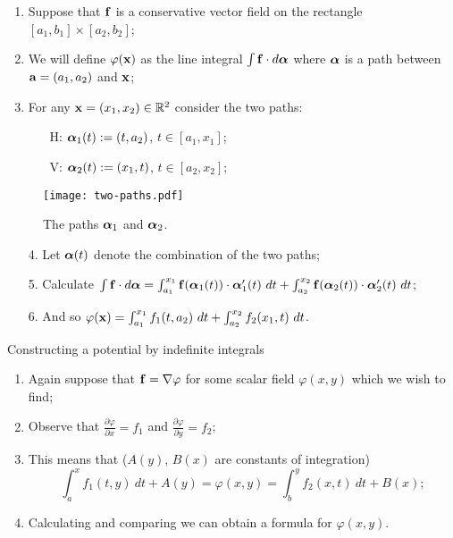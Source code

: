 \begin{enumerate}
    \item Suppose that \(\ff\) is a conservative vector field on the rectangle \([a_1,b_1]\times [a_2,b_2]\);
    \item We will define \(\varphi(\xx)\) as the line integral \(\int \ff \cdot d\aalpha\) where \(\aalpha\) is a path between \(\aa=(a_1,a_2)\) and \(\xx\);
    \item For any \(\xx = (x_1,x_2) \in \bR^2\) consider the two paths:
          \begin{itemize}
              \item[H:] \(\aalpha_1(t) := (t,a_2)\), \(t\in [a_1,x_1]\);
              \item[V:]  \(\aalpha_2(t) := (x_1,t)\),  \(t\in [a_2,x_2]\);
          \end{itemize}
\end{enumerate}

\begin{figure}[htbp]
    \centering
    \texttt{[image: two-paths.pdf]}
    \caption{The paths \(\aalpha_1\) and \(\aalpha_2\).}
\end{figure}

\begin{enumerate}
    \item[4.] Let \(\aalpha(t)\) denote the combination of the two paths;
    \item[5.] Calculate \(\int \ff \cdot d\aalpha = \int_{a_1}^{x_1} \ff(\aalpha_1(t))\cdot \aalpha_1'(t) \ dt +  \int_{a_2}^{x_2} \ff(\aalpha_2(t))\cdot \aalpha_2'(t) \ dt \);
    \item[6.] And so \(\varphi(\xx)  = \int_{a_1}^{x_1} f_1(t,a_2)\ dt + \int_{a_2}^{x_2} f_2(x_1,t)\ dt \).
\end{enumerate}




{Constructing a potential by indefinite integrals}

\begin{enumerate}
    \item Again suppose that \(\ff = \nabla \varphi\) for some scalar field \(\varphi(x,y)\) which we wish to find;
    \item Observe that \(\frac{\partial \varphi}{\partial x} = f_1\) and  \(\frac{\partial \varphi}{\partial y} = f_2\);
    \item  This means that (\(A(y)\), \(B(x)\) are constants of integration)
          \[
              \int_{a}^{x} f_1(t,y) \ dt + A(y) = \varphi(x,y) =  \int_{b}^{y} f_2(x,t) \ dt + B(x);
          \]
    \item Calculating and comparing we can obtain a formula for \(\varphi(x,y)\).
\end{enumerate}


